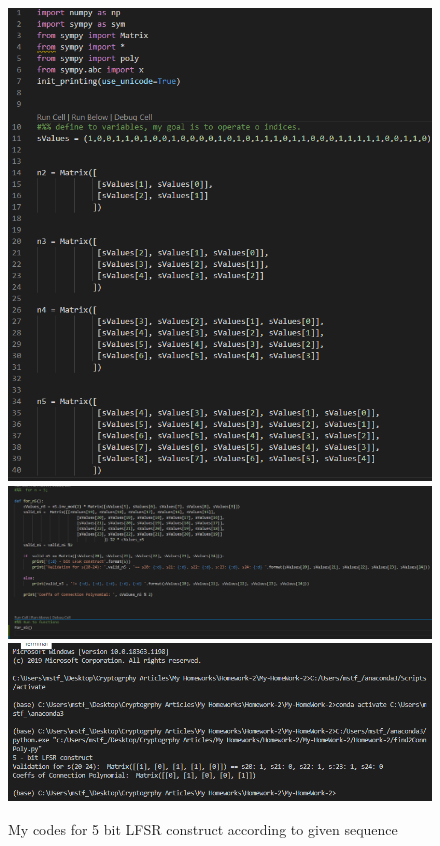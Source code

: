 \documentclass[a4paper, 11pt]{article}
\begin{document}
\begin{figure}[!h]
  \includegraphics[width=\linewidth]{findToConnPoly__Define_Variable.png}
  \includegraphics[width=\linewidth]{findToConnPoly_Function.png}
  \includegraphics[width=\linewidth]{findToConnPoly_Result.png}
  \caption{My codes for 5 bit LFSR construct according to given sequence }
  \label{fig:resim}
\end{figure}
\end{document}
